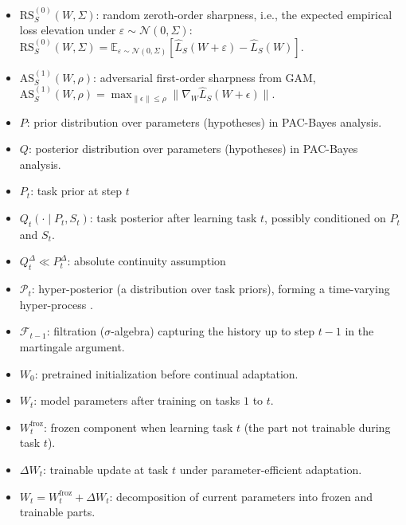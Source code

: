 \documentclass{article}
\theoremstyle{plain}
\theoremstyle{definition}
\theoremstyle{remark}
\begin{document}
\begin{itemize}
\item $\mathrm{RS}_S^{(0)}(W,\Sigma)$: random zeroth-order sharpness, i.e., the expected empirical loss elevation under $\varepsilon\sim\mathcal N(0,\Sigma)$:
$\mathrm{RS}_S^{(0)}(W,\Sigma)=\mathbb E_{\varepsilon\sim\mathcal N(0,\Sigma)}[\hat L_S(W+\varepsilon)-\hat L_S(W)]$.
\item $\mathrm{AS}^{(1)}_S(W,\rho)$: adversarial first-order sharpness  from GAM,
$\mathrm{AS}^{(1)}_S(W,\rho)=\max_{\|\epsilon\|\le\rho}\|\nabla_W\widehat L_S(W+\epsilon)\|$.

\item $P$: prior distribution over parameters (hypotheses) in PAC-Bayes analysis.
\item $Q$: posterior distribution over parameters (hypotheses) in PAC-Bayes analysis.

\item $P_t$: task prior at step $t$ 
\item $Q_t(\cdot \mid P_t,S_t)$: task posterior after learning task $t$, possibly conditioned on $P_t$ and $S_t$.
\item $Q_t^\Delta \ll P_t^\Delta$: absolute continuity assumption
\item $\mathcal P_t$: hyper-posterior (a distribution over task priors), forming a time-varying hyper-process . 
\item $\mathcal F_{t-1}$: filtration ($\sigma$-algebra) capturing the history up to step $t-1$ in the martingale argument.

\item $W_0$: pretrained initialization before continual adaptation.
\item $W_t$: model parameters after training on tasks $1$ to $t$.
\item $W_t^{\mathrm{froz}}$: frozen component when learning task $t$ (the part not trainable during task $t$).
\item $\Delta W_t$: trainable update at task $t$ under parameter-efficient adaptation.
\item $W_t = W_t^{\mathrm{froz}} + \Delta W_t$: decomposition of current parameters into frozen and trainable parts. 






\end{itemize}
\end{document}
